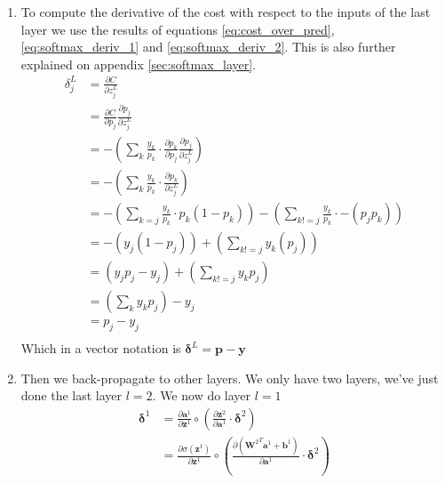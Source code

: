 			\begin{enumerate}
				\item To compute the derivative of the cost with respect to the inputs of the last layer we use the results of equations \ref{eq:cost_over_pred}, \ref{eq:softmax_deriv_1} and \ref{eq:softmax_deriv_2}. This is also further explained on appendix \ref{sec:softmax_layer}.
					\begin{equation}
						\begin{split}
							\delta^L_j
							&= \frac{\partial C}{\partial z^L_j } \\
							&= \frac{\partial C}{\partial p_j} \frac{\partial p_j}{\partial z^L_j } \\
							&= -\left(\sum_k \frac{y_k}{p_k} \cdot \frac{\partial p_k}{\partial p_j } \frac{\partial p_j}{\partial z^L_j } \right) \\
							&= -\left(\sum_k \frac{y_k}{p_k} \cdot \frac{\partial p_k}{\partial z^L_j } \right) \\
							&= -\left(\sum_{k=j} \frac{y_k}{p_k} \cdot p_k(1 - p_k) \right) - \left(\sum_{k!=j} \frac{y_k}{p_k} \cdot -(p_j p_k) \right) \\
							&= -\left(y_j  (1 - p_j) \right) + \left(\sum_{k!=j} y_k(p_j) \right) \\
							&=  \left(y_j p_j  - y_j\right)  + \left(\sum_{k!=j} y_k p_j  \right) \\
							&=  \left(\sum_{k} y_k p_j  \right) - y_j \\
							&=  p_j - y_j \\
						\end{split}
					\end{equation}
					Which in a vector notation is $\boldsymbol{\delta}^L = \boldsymbol{p} - \boldsymbol{y}$
				\item Then we back-propagate to other layers. We only have two layers, we've just done the last layer $l=2$. We now do layer $l=1$
					\begin{equation}
						\begin{split}
							\boldsymbol{\delta}^{1}
							&= \frac{\partial \boldsymbol{a}^1 }		{\partial \boldsymbol{z}^1 } 		\circ
							\left( \frac{\partial \boldsymbol{z}^2 }	{\partial \boldsymbol{a}^1 } \cdot \boldsymbol{\delta}^2 \right) \\
							&= \frac{\partial \sigma(\boldsymbol{z}^1)}	{\partial \boldsymbol{z}^1}\circ
							\left( \frac{\partial ({\boldsymbol{W}^2}^T \boldsymbol{a}^1 + \boldsymbol{b}^1 )}{\partial \boldsymbol{a}^1} \cdot \boldsymbol{\delta}^2 \right)\\

\end{split}
\end{equation}
\end{enumerate}
